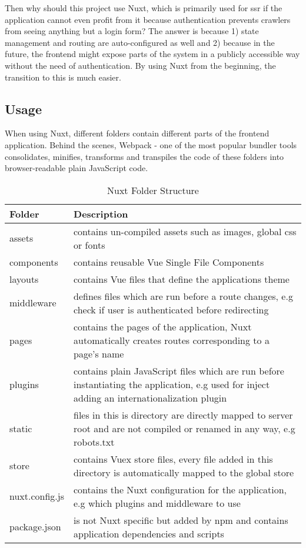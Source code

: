 Then why should this project use Nuxt, which is primarily used for \acrshort{ssr} if the application cannot even profit from it because authentication prevents crawlers from seeing anything but a login form? The answer is because 1) state management and routing are auto-configured as well and 2) because in the future, the frontend might expose parts of the system in a publicly accessible way without the need of authentication. By using Nuxt from the beginning, the transition to this is much easier.

\subsection{Usage}
When using Nuxt, different folders contain different parts of the frontend application. Behind the scenes, Webpack - one of the most popular bundler tools consolidates, minifies, transforms and transpiles the code of these folders into browser-readable plain JavaScript code. 

\begin{table}
    \begin{tabularx}{\linewidth}{|l|X|}
        \hline
        \textbf{Folder} & \textbf{Description} \\
        \hline
        assets & contains un-compiled assets such as images, global css or fonts  \\
        \hline
        components & contains reusable Vue Single File Components \\
        \hline
        layouts & contains Vue files that define the applications theme \\
        \hline
        middleware & defines files which are run before a route changes, e.g check if user is authenticated before redirecting \\
        \hline
        pages & contains the pages of the application, Nuxt automatically creates routes corresponding to a page's name \\
        \hline
        plugins & contains plain JavaScript files which are run before instantiating the application, e.g used for inject adding an internationalization plugin \\
        \hline
        static & files in this is directory are directly mapped to server root and are not compiled or renamed in any way, e.g robots.txt \\
        \hline
        store & contains Vuex store files, every file added in this directory is automatically mapped to the global store \\
        \hline
        nuxt.config.js & contains the Nuxt configuration for the application, e.g which plugins and middleware to use\\
        \hline
        package.json & is not Nuxt specific but added by npm and contains application dependencies and scripts \\
        \hline
    \end{tabularx}
    \caption{Nuxt Folder Structure}
    \label{table:filestructure}
\end{table}


